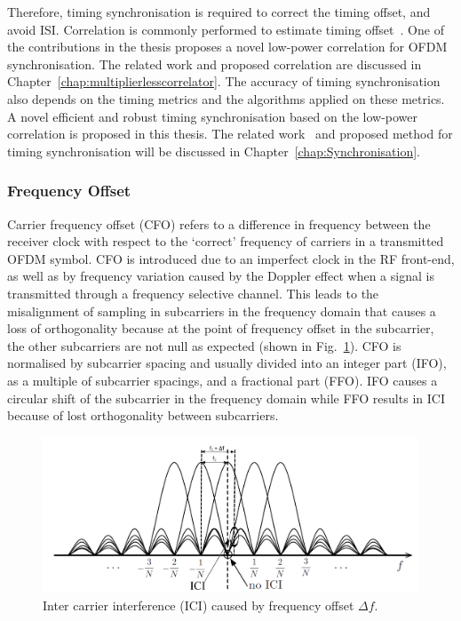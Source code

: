 Therefore, timing synchronisation is required to correct the timing offset, and avoid ISI.
Correlation is commonly performed to estimate timing offset~\cite{Dick2003,Fort2003,Wang2004}. One of the contributions in the thesis proposes a novel low-power correlation for OFDM synchronisation. The related work and proposed correlation are discussed in Chapter~\ref{chap:multiplierlesscorrelator}.
The accuracy of timing synchronisation also depends on the timing metrics and the algorithms applied on these metrics. A novel efficient and robust timing synchronisation based on the low-power correlation is proposed in this thesis. The related work~\cite{Schmidl1997,Kishore2006,Guffey2007,Huang2010,Recio2010} and proposed method for timing synchronisation will be discussed in Chapter~\ref{chap:Synchronisation}.
\subsubsection{Frequency Offset}

Carrier frequency offset (CFO) refers to a difference in frequency between the receiver clock with respect to the `correct' frequency of carriers in a transmitted OFDM symbol.
CFO is introduced due to an imperfect clock in the RF front-end, as well as by frequency variation caused by the Doppler effect when a signal is transmitted through a frequency selective channel.
This leads to the misalignment of sampling in subcarriers in the frequency domain that causes a loss of orthogonality because at the point of frequency offset in the subcarrier, the other subcarriers are not null as expected (shown in Fig.~\ref{fig:OFDM-subcarrier-freoff}).
CFO is normalised by subcarrier spacing and usually divided into an integer part (IFO), as a multiple of subcarrier spacings, and a fractional part (FFO).
IFO causes a circular shift of the subcarrier in the frequency domain while FFO results in ICI because of lost orthogonality between subcarriers.

\begin{figure}
	\centerline{\includegraphics [width=0.8\columnwidth] {Figures/OFDM-subcarrier-freoff.pdf} }
	\caption{Inter carrier interference (ICI) caused by frequency offset $\Delta f$.}
	\label{fig:OFDM-subcarrier-freoff}
\end{figure}

